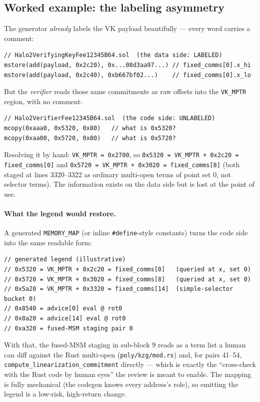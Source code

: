 \subsection{Worked example: the labeling asymmetry}
\label{sec:pr-legend-example}

The generator \emph{already} labels the VK payload beautifully --- every
word carries a comment:
\begin{lstlisting}[style=yul]
// Halo2VerifyingKeyFee12345B64.sol  (the data side: LABELED)
mstore(add(payload, 0x2c20), 0x...08d3aa97...) // fixed_comms[0].x_hi
mstore(add(payload, 0x2c40), 0xb667bf02...)    // fixed_comms[0].x_lo
\end{lstlisting}
But the \emph{verifier} reads those same commitments as raw offsets into
the \texttt{VK\_MPTR} region, with no comment:
\begin{lstlisting}[style=yul]
// Halo2VerifierFee12345B64.sol  (the code side: UNLABELED)
mcopy(0xaaa0, 0x5320, 0x80)   // what is 0x5320?
mcopy(0xaa00, 0x5720, 0x80)   // what is 0x5720?
\end{lstlisting}
Resolving it by hand: \texttt{VK\_MPTR = 0x2700}, so
\texttt{0x5320 = VK\_\allowbreak{}MPTR + 0x2c20 = fixed\_\allowbreak{}comms[0]} and
\texttt{0x5720 = VK\_\allowbreak{}MPTR + 0x3020 = fixed\_\allowbreak{}comms[8]} (both staged at
lines 3320--3322 as ordinary multi-open terms of point set 0, not
selector terms). The information
exists on the data side but is lost at the point of use.

\paragraph{What the legend would restore.} A generated
\texttt{MEMORY\_MAP} (or inline \texttt{\#define}-style constants)
turns the code side into the same readable form:
\begin{lstlisting}[style=yul]
// generated legend (illustrative)
// 0x5320 = VK_MPTR + 0x2c20 = fixed_comms[0]   (queried at x, set 0)
// 0x5720 = VK_MPTR + 0x3020 = fixed_comms[8]   (queried at x, set 0)
// 0x5a20 = VK_MPTR + 0x3320 = fixed_comms[14]  (simple-selector bucket 0)
// 0x8540 = advice[0] eval @ rot0
// 0x8a20 = advice[14] eval @ rot0
// 0xa320 = fused-MSM staging pair 0
\end{lstlisting}
With that, the fused-MSM staging in sub-block 9 reads as a term list a
human can diff against the Rust multi-open (\texttt{poly/kzg/mod.rs})
and, for pairs 41--54, \texttt{compute\_\allowbreak{}linearization\_\allowbreak{}commitment}
directly --- which is exactly the ``cross-check with the Rust code by
human eyes'' the review is meant to enable. The mapping is fully
mechanical (the codegen knows every address's role), so emitting the
legend is a low-risk, high-return change. 


